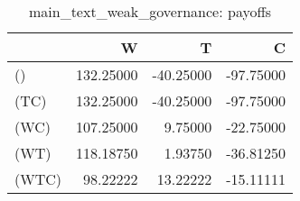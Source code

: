 \begin{table}
\centering
\caption{main_text_weak_governance: payoffs}
\begin{tabular}{lrrr}
\toprule
{} &         W &         T &         C \\
\midrule
()    & 132.25000 & -40.25000 & -97.75000 \\
(TC)  & 132.25000 & -40.25000 & -97.75000 \\
(WC)  & 107.25000 &   9.75000 & -22.75000 \\
(WT)  & 118.18750 &   1.93750 & -36.81250 \\
(WTC) &  98.22222 &  13.22222 & -15.11111 \\
\bottomrule
\end{tabular}
\end{table}
